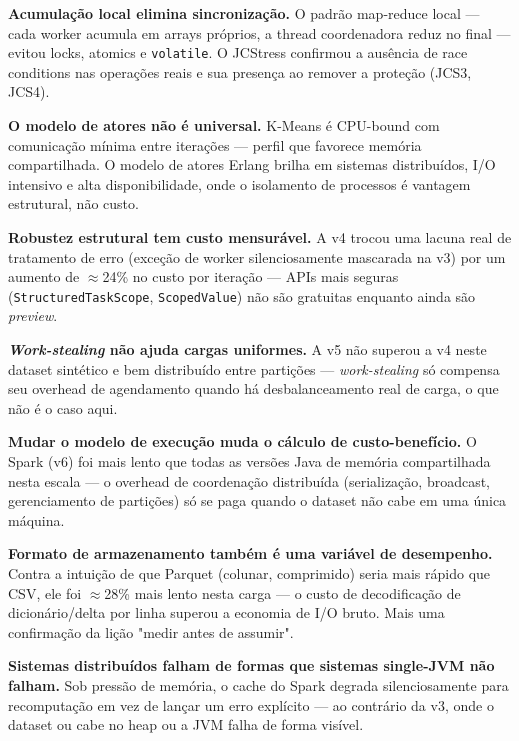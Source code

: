 \textbf{Acumulação local elimina sincronização.}
O padrão map-reduce local — cada worker acumula em arrays próprios, a thread
coordenadora reduz no final — evitou locks, atomics e \texttt{volatile}.
O JCStress confirmou a ausência de race conditions nas operações reais e sua
presença ao remover a proteção (JCS3, JCS4).

\textbf{O modelo de atores não é universal.}
K-Means é CPU-bound com comunicação mínima entre iterações — perfil que favorece
memória compartilhada. O modelo de atores Erlang brilha em sistemas distribuídos,
I/O intensivo e alta disponibilidade, onde o isolamento de processos é vantagem
estrutural, não custo.

\textbf{Robustez estrutural tem custo mensurável.}
A v4 trocou uma lacuna real de tratamento de erro (exceção de worker
silenciosamente mascarada na v3) por um aumento de $\approx$24\% no custo por
iteração --- APIs mais seguras (\texttt{StructuredTaskScope},
\texttt{ScopedValue}) não são gratuitas enquanto ainda são \textit{preview}.

\textbf{\textit{Work-stealing} não ajuda cargas uniformes.}
A v5 não superou a v4 neste dataset sintético e bem distribuído entre
partições --- \textit{work-stealing} só compensa seu overhead de agendamento
quando há desbalanceamento real de carga, o que não é o caso aqui.

\textbf{Mudar o modelo de execução muda o cálculo de custo-benefício.}
O Spark (v6) foi mais lento que todas as versões Java de memória compartilhada
nesta escala --- o overhead de coordenação distribuída (serialização,
broadcast, gerenciamento de partições) só se paga quando o dataset não cabe
em uma única máquina.

\textbf{Formato de armazenamento também é uma variável de desempenho.}
Contra a intuição de que Parquet (colunar, comprimido) seria mais rápido que
CSV, ele foi $\approx$28\% mais lento nesta carga --- o custo de decodificação
de dicionário/delta por linha superou a economia de I/O bruto. Mais uma
confirmação da lição "medir antes de assumir".

\textbf{Sistemas distribuídos falham de formas que sistemas single-JVM não falham.}
Sob pressão de memória, o cache do Spark degrada silenciosamente para
recomputação em vez de lançar um erro explícito --- ao contrário da v3, onde o
dataset ou cabe no heap ou a JVM falha de forma visível.
